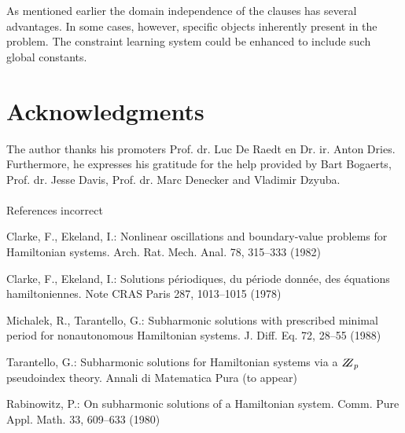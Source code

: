 \documentclass{llncs}
\begin{document}
As mentioned earlier the domain independence of the clauses has several advantages.
In some cases, however, specific objects inherently present in the problem.
The constraint learning system could be enhanced to include such global constants.

\section*{Acknowledgments}
The author thanks his promoters Prof. dr. Luc De Raedt en Dr. ir. Anton Dries.
Furthermore, he expresses his gratitude for the help provided by Bart Bogaerts, Prof. dr. Jesse Davis, Prof. dr. Marc Denecker and Vladimir Dzyuba.
\\\\
{\color{red} References incorrect}

%
%
\begin{thebibliography}{}
%
Clarke, F., Ekeland, I.:
Nonlinear oscillations and
boundary-value problems for Hamiltonian systems.
Arch. Rat. Mech. Anal. 78, 315--333 (1982)

Clarke, F., Ekeland, I.:
Solutions p\'{e}riodiques, du
p\'{e}riode donn\'{e}e, des \'{e}quations hamiltoniennes.
Note CRAS Paris 287, 1013--1015 (1978)

Michalek, R., Tarantello, G.:
Subharmonic solutions with prescribed minimal
period for nonautonomous Hamiltonian systems.
J. Diff. Eq. 72, 28--55 (1988)

Tarantello, G.:
Subharmonic solutions for Hamiltonian
systems via a $\bbbz_{p}$ pseudoindex theory.
Annali di Matematica Pura (to appear)

Rabinowitz, P.:
On subharmonic solutions of a Hamiltonian system.
Comm. Pure Appl. Math. 33, 609--633 (1980)

\end{thebibliography}
\end{document}
